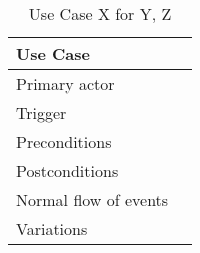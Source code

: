 \begin{table}[h]
	\begin{center}
	    \begin{tabular}{p{3cm}|p{7cm}}
		    \hline
		    Use Case &   \\ \hline
		    Primary actor & \\ \hline
		    Trigger & \\ \hline
		    Preconditions & \\ \hline
		    Postconditions & \\ \hline
		    Normal flow of events & \\ \hline
		    Variations & \\ \hline
	    \end{tabular}
    \end{center}
    \caption{Use Case X for Y, Z}
    \label{tab:YUseCaseX}
\end{table}
